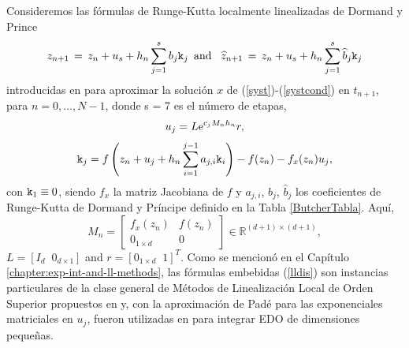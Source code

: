 Consideremos las fórmulas de Runge-Kutta localmente linealizadas de Dormand y Prince
\begin{equation} \label{lldis}
    z_{n+1}\,=\,z_n+u_s+h_n \sum_{j=1}^{s}b_j \mathtt{k}_j \,\,\, \text{and} \,\,\, \
    \widehat{z}_{n+1}\,=\, z_n+u_s+h_n \sum_{j=1}^{s}\widehat{b}_j \mathtt{k}_j
\end{equation}
introducidas en \cite{Jimenez14AMC} para aproximar la solución $x$ de (\ref{syst})-(\ref{systcond}) en $t_{n+1}$, para $n=0,\ldots,N -1$, donde s = 7 es el número de etapas,
\begin{equation*}
u_j=L\mathrm{e}^{c_j M_n h_n}r,
\end{equation*}
\begin{equation*}
\mathtt{k}_j = f\left( z_n+u_j+h_n \sum_{i=1}^{j-1}a_{j,i}\mathtt{k}_i \right) - f( z_n) - f_x(z_n)u_j,
\end{equation*}
con $\mathtt{k}_1 \equiv 0$, siendo $f_x$ la matriz Jacobiana de $f$ y $a_{j,i}$, $b_j$, $\widehat{b}_j$ los coeficientes de Runge-Kutta de Dormand y Príncipe definido en la Tabla \ref{ButcherTabla}. Aquí,
\begin{equation*}
    M_{n}=\left[
    \begin{array}{cc}
        f_{x}(z_{n}) & f(z_{n}) \\
        0_{1\times d} & 0
    \end{array}
    \right] \in \mathbb{R}^{(d+1)\times (d+1)},
\end{equation*}
$ L=[I_d \;\; 0_{d\times 1}] $ and $r=[0_{1\times d}\;\; 1]^T$. Como se mencionó en el Capítulo \ref{chapter:exp-int-and-ll-methods}, las fórmulas embebidas (\ref{lldis}) son instancias particulares de la clase general de Métodos de Linealización Local de Orden Superior propuestos en \cite{Jimenez13} y, con la aproximación de Padé para las exponenciales matriciales en $u_j$, fueron utilizadas en \cite{Jimenez14AMC} para integrar EDO de dimensiones pequeñas.

